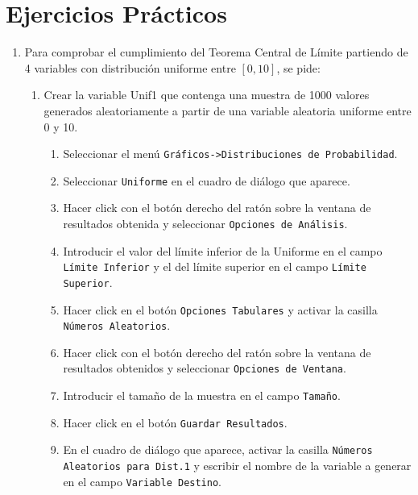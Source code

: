 \documentclass[a4paper]{article}
\begin{document}
\section*{Ejercicios Prácticos}
\begin{enumerate}[leftmargin=*]

\item Para comprobar el cumplimiento del Teorema Central de Límite
partiendo de 4 variables con distribución uniforme entre $[0,10]$,
se pide:

\begin {enumerate}

\item Crear la variable \textsf{Unif1} que contenga una muestra de 1000 valores
generados aleatoriamente a partir de una variable aleatoria uniforme entre 0 y 10. 
\begin{indicacion}{
\begin{enumerate}
\item Seleccionar el menú \texttt{Gráficos->Distribuciones de Probabilidad}.
\item Seleccionar \texttt{Uniforme} en el cuadro de diálogo que aparece.
\item Hacer click con el botón derecho del ratón sobre la ventana de resultados obtenida y seleccionar \texttt{Opciones de Análisis}.
\item Introducir el valor del límite inferior de la Uniforme en el campo \texttt{Límite Inferior} y el del límite superior en el campo \texttt{Límite Superior}. 
\item Hacer click en el botón \texttt{Opciones Tabulares} y activar la casilla \texttt{Números Aleatorios}.
\item Hacer click con el botón derecho del ratón sobre la ventana de resultados obtenidos y seleccionar \texttt{Opciones de Ventana}.
\item Introducir el tamaño de la muestra en el campo \texttt{Tamaño}.
\item Hacer click en el botón \texttt{Guardar Resultados}.
\item En el cuadro de diálogo que aparece, activar la casilla \texttt{Números Aleatorios para Dist.1} y escribir el nombre de la variable a generar en el campo \texttt{Variable Destino}.
\end{enumerate}}
\end{indicacion}


\end{enumerate}
\end{enumerate}
\end{document}
